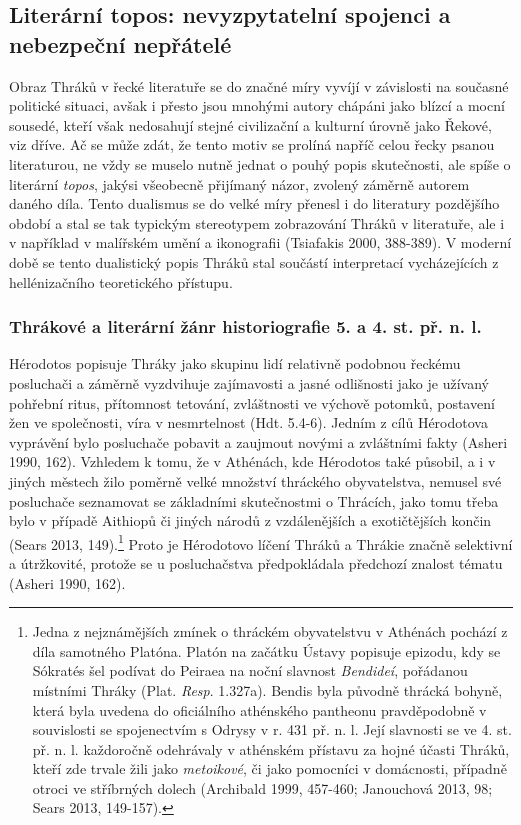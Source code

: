 
\subsection[literární-topos-nevyzpytatelní-spojenci-a-nebezpeční-nepřátelé]{Literární topos: nevyzpytatelní spojenci a nebezpeční nepřátelé}

Obraz Thráků v řecké literatuře se do značné míry vyvíjí v závislosti na současné politické situaci, avšak i přesto jsou mnohými autory chápáni jako blízcí a mocní sousedé, kteří však nedosahují stejné civilizační a kulturní úrovně jako Řekové, viz dříve. Ač se může zdát, že tento motiv se prolíná napříč celou řecky psanou literaturou, ne vždy se muselo nutně jednat o pouhý popis skutečnosti, ale spíše o literární {\em topos}, jakýsi všeobecně přijímaný názor, zvolený záměrně autorem daného díla. Tento dualismus se do velké míry přenesl i do literatury pozdějšího období a stal se tak typickým stereotypem zobrazování Thráků v literatuře, ale i v například v malířském umění a ikonografii (Tsiafakis 2000, 388-389). V moderní době se tento dualistický popis Thráků stal součástí interpretací vycházejících z hellénizačního teoretického přístupu.

\subsubsection[thrákové-a-literární-žánr-historiografie-5.-a-4.-st.-př.-n.-l.]{Thrákové a literární žánr historiografie 5. a 4. st. př. n. l.}

Hérodotos popisuje Thráky jako skupinu lidí relativně podobnou řeckému posluchači a záměrně vyzdvihuje zajímavosti a jasné odlišnosti jako je užívaný pohřební ritus, přítomnost tetování, zvláštnosti ve výchově potomků, postavení žen ve společnosti, víra v nesmrtelnost (Hdt. 5.4-6). Jedním z cílů Hérodotova vyprávění bylo posluchače pobavit a zaujmout novými a zvláštními fakty (Asheri 1990, 162). Vzhledem k tomu, že v Athénách, kde Hérodotos také působil, a i v jiných městech žilo poměrně velké množství thráckého obyvatelstva, nemusel své posluchače seznamovat se základními skutečnostmi o Thrácích, jako tomu třeba bylo v případě Aithiopů či jiných národů z vzdálenějších a exotičtějších končin (Sears 2013, 149).\footnote{Jedna z nejznámějších zmínek o thráckém obyvatelstvu v Athénách pochází z díla samotného Platóna. Platón na začátku Ústavy popisuje epizodu, kdy se Sókratés šel podívat do Peiraea na noční slavnost {\em Bendideí}, pořádanou místními Thráky (Plat. {\em Resp}. 1.327a). Bendis byla původně thrácká bohyně, která byla uvedena do oficiálního athénského pantheonu pravděpodobně v souvislosti se spojenectvím s Odrysy v r. 431 př. n. l. Její slavnosti se ve 4. st. př. n. l. každoročně odehrávaly v athénském přístavu za hojné účasti Thráků, kteří zde trvale žili jako {\em metoikové}, či jako pomocníci v domácnosti, případně otroci ve stříbrných dolech (Archibald 1999, 457-460; Janouchová 2013, 98; Sears 2013, 149-157).} Proto je Hérodotovo líčení Thráků a Thrákie značně selektivní a útržkovité, protože se u posluchačstva předpokládala předchozí znalost tématu (Asheri 1990, 162).

